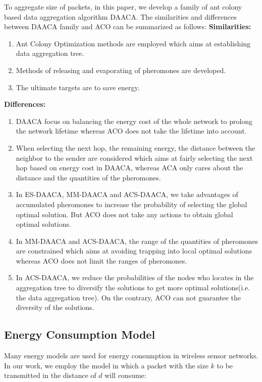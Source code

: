 \documentclass{elsarticle}
\begin{document}
To aggregate size of packets, in this paper, we develop a family of ant colony based data aggregation algorithm DAACA. The similarities and differences between DAACA family and ACO can be summarized as follows:
\textbf{Similarities:}
\begin{enumerate}
\item Ant Colony Optimization methods are employed which aims at establishing data aggregation tree.
\item Methods of releasing and evaporating of pheromones are developed.
\item The ultimate targets are to save energy.
\end{enumerate}
\textbf{Differences:}
\begin{enumerate}
\item DAACA focus on balancing the energy cost of the whole network to prolong the network lifetime whereas ACO does not take the lifetime into account.
\item When selecting the next hop, the remaining energy, the distance between the neighbor to the sender are considered which aims at fairly selecting the next hop based on energy cost in DAACA, whereas ACA only cares about the distance and the quantities of the pheromones.
\item In ES-DAACA, MM-DAACA and ACS-DAACA, we take advantages of accumulated pheromones to increase the probability of selecting the global optimal solution. But ACO does not take any actions to obtain global optimal solutions.
\item In MM-DAACA and ACS-DAACA, the range of the quantities of pheromones are constrained which aims at avoiding trapping into local optimal solutions whereas ACO does not limit the ranges of pheromones.
\item In ACS-DAACA, we reduce the probabilities of the nodes who locates in the aggregation tree to diversify the solutions to get more optimal solutions(i.e. the data aggregation tree). On the contrary, ACO can not guarantee the diversity of the solutions.
\end{enumerate}

\subsection{Energy Consumption Model} \label{energyConsumptionModel}
Many energy models \cite{label-15} are used for energy consumption in wireless sensor networks. In our work, we employ the model in which a packet with the size $k$ to be transmitted in the distance of $d$ will consume:
\end{document}
